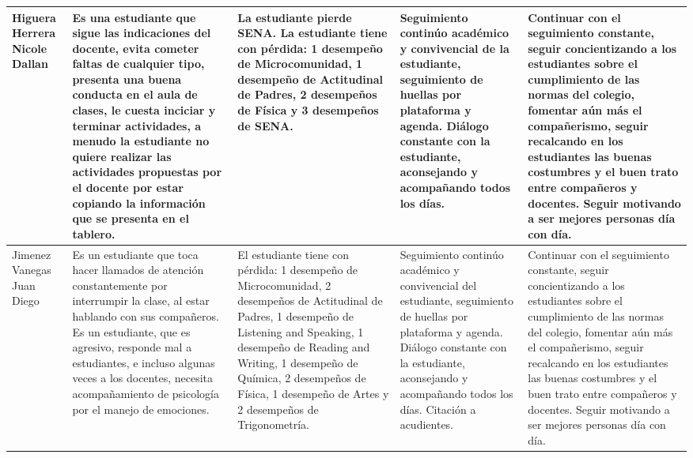 \documentclass[spanish,11pt,a4paper]{article}
\begin{document}
\begin{longtable}{|p{3.5cm}|p{3.5cm}|p{3.5cm}|p{3.5cm}|p{3.5cm}|}
		Higuera Herrera Nicole Dallan & 
		Es una estudiante que sigue las indicaciones del docente, evita cometer faltas de cualquier tipo, presenta una buena conducta en el aula de clases, le cuesta inciciar y terminar actividades, a menudo la estudiante no quiere realizar las actividades propuestas por el docente por estar copiando la información que se presenta en el tablero. & 
		La estudiante pierde SENA.
		La estudiante tiene con pérdida: 1 desempeño de Microcomunidad, 1 desempeño de Actitudinal de Padres, 2 desempeños de Física y 3 desempeños de SENA. & 
		Seguimiento continúo académico y convivencial de la estudiante, seguimiento de huellas por plataforma y agenda. Diálogo constante con la estudiante, aconsejando y acompañando todos los días. & 
		Continuar con el seguimiento constante, seguir concientizando a los estudiantes sobre el cumplimiento de las normas del colegio, fomentar aún más el compañerismo, seguir recalcando en los estudiantes las buenas costumbres y el buen trato entre compañeros y docentes. Seguir motivando a ser mejores personas día con día.\\
		\hline
		
		Jimenez Vanegas Juan Diego & 
		Es un estudiante  que toca hacer llamados de atención constantemente por interrumpir la clase, al estar hablando con sus compañeros. Es un estudiante, que es agresivo, responde mal a estudiantes, e incluso algunas veces a los docentes, necesita acompañamiento de psicología por el manejo de emociones.& 
		El estudiante tiene con pérdida: 1 desempeño de Microcomunidad, 2 desempeños de Actitudinal de Padres, 1 desempeño de Listening and Speaking, 1 desempeño de Reading and Writing, 1 desempeño de Química, 2 desempeños de Física, 1 desempeño de Artes y 2 desempeños de Trigonometría. & 
		Seguimiento continúo académico y convivencial del estudiante, seguimiento de huellas por plataforma y agenda. Diálogo constante con la estudiante, aconsejando y acompañando todos los días.  Citación a acudientes.& 
		Continuar con el seguimiento constante, seguir concientizando a los estudiantes sobre el cumplimiento de las normas del colegio, fomentar aún más el compañerismo, seguir recalcando en los estudiantes las buenas costumbres y el buen trato entre compañeros y docentes. Seguir motivando a ser mejores personas día con día.\\
		\hline
		

\end{longtable}
\end{document}
